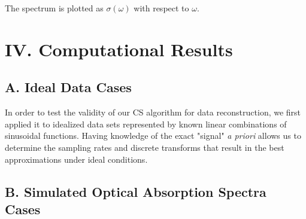 \documentclass[11pt]{article}
\begin{document}
The spectrum is plotted as $\sigma(\omega)$ with respect to $\omega$.


\section*{IV.	Computational Results} %


\subsection*{A.	Ideal Data Cases}
In order to test the validity of our CS algorithm for data reconstruction, we first applied it to idealized data sets represented by known linear combinations of sinusoidal functions. Having knowledge of the exact "signal" \emph{a priori} allows us to determine the sampling rates and discrete transforms that result in the best approximations under ideal conditions. 



\subsection*{B.	Simulated Optical Absorption Spectra Cases}








\end{document}
